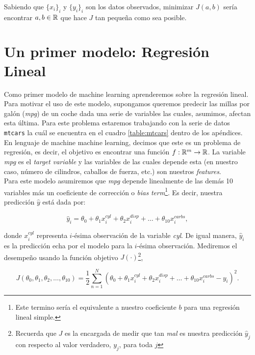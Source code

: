 \documentclass[11pt]{article}
\begin{document}
Sabiendo que $\{x_i\}_i$ y $\{y_i\}_i$ son los datos observados, minimizar $J(a, b)$ sería encontrar $a, b \in \mathbb{R}$ que hace $J$ tan pequeña como sea posible.

\section{Un primer modelo: Regresión Lineal}
Como primer modelo de machine learning aprenderemos sobre la regresión lineal. Para motivar el uso de este modelo, supongamos queremos predecir las millas por galón (\textit{mpg}) de un coche dada una serie de variables las cuales, asumimos, afectan esta última. Para este problema estaremos trabajando con la serie de datos \texttt{mtcars} la cuál se encuentra en el cuadro \ref{table:mtcars} dentro de los apéndices.\\

En lenguaje de machine machine learning, decimos que este es un problema de regresión, es decir, el objetivo es encontrar una función $f:\mathbb{R}^m \to \mathbb{R}$. La variable \textit{mpg} es el \textit{target variable} y las variables de las cuales depende esta (en nuestro caso, número de cilindros, caballos de fuerza, etc.) son nuestros \textit{features}.\\

Para este modelo asumiremos que \textit{mpg} depende linealmente de las demás 10 variables más un coeficiente de corrección o \textit{bias term}\footnote{Este termino sería el equivalente a nuestro coeficiente $b$ para una regresión lineal simple.}. Es decir, nuestra predicción $\hat y$ está dada por:

\begin{equation}
	\hat y_i = \theta_0 + \theta_1x^{cyl}_i + \theta_2x^{disp}_i + \ldots + \theta_{10}x^{carbs}_i,
\end{equation}

donde $x_i^{cyl}$ representa $i$-ésima observación de la variable \textit{cyl}. De igual manera, $\hat y_i$ es la predicción echa por el modelo para la $i$-ésima observación. Mediremos el desempeño usando la función objetivo $J(\cdot)$\footnote{Recuerda que $J$ es la encargada de medir que tan \textit{mal} es nuestra predicción $\hat y_j$ con respecto al valor verdadero, $y_j$, para toda $j$},

\begin{equation}
J(\theta_0, \theta_1, \theta_2, \ldots, \theta_{10}) = \frac{1}{2}\sum_{n=1}^N(\theta_0 + \theta_1x^{cyl}_i + \theta_2x^{disp}_i + \ldots + \theta_{10}x^{carbs}_i - y_i)^2.
\end{equation}
 
\end{document}

